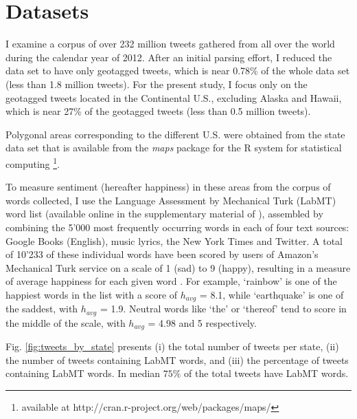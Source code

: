 \documentclass{llncs}
\begin{document}
\section{Datasets}
\label{sec:datasets}

I examine a corpus of over 232 million tweets gathered from all over the world during the calendar year of 2012. After an initial parsing effort, I reduced the data set to have only geotagged tweets, which is near 0.78\% of the whole data set (less than 1.8 million tweets). For the present study, I focus only on the geotagged tweets located in the Continental U.S., excluding Alaska and Hawaii, which is near 27\% of the geotagged tweets (less than 0.5 million tweets).

Polygonal areas corresponding to the different U.S. were obtained from the state data set that is available from the \emph{maps} package for the R system for statistical computing \footnote{available at http://cran.r-project.org/web/packages/maps/}.

To measure sentiment (hereafter happiness) in these areas from the corpus of words collected, I use the Language Assessment by Mechanical Turk (LabMT) word list (available online in the supplementary material of \cite{Dodds2011}), assembled by combining the 5'000 most frequently occurring words in each of four text sources: Google Books (English), music lyrics, the New York Times and Twitter. A total of  10'233 of these individual words have been scored by users of Amazon’s Mechanical Turk service on a scale of 1 (sad) to 9 (happy), resulting in a measure of average happiness for each given word \cite{Kloumann2012}. For example, `rainbow' is one of the happiest words in the list with a score of $h_{avg}$ = 8.1, while `earthquake' is one of the saddest, with $h_{avg}$ = 1.9. Neutral words like `the' or `thereof' tend to score in the middle of the scale, with $h_{avg}$ = 4.98 and 5 respectively.

Fig. \ref{fig:tweets_by_state} presents (i) the total number of tweets per state, (ii) the number of tweets containing LabMT words, and (iii) the percentage of tweets containing LabMT words. In median $75\%$ of the total tweets have LabMT words.
\end{document}
